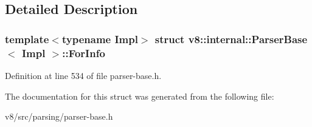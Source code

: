 \subsection{Detailed Description}
\subsubsection*{template$<$typename Impl$>$\newline
struct v8\+::internal\+::\+Parser\+Base$<$ Impl $>$\+::\+For\+Info}



Definition at line 534 of file parser-\/base.\+h.



The documentation for this struct was generated from the following file\+:\begin{DoxyCompactItemize}
\item 
v8/src/parsing/parser-\/base.\+h\end{DoxyCompactItemize}
